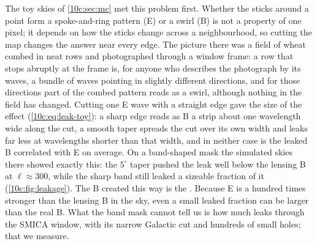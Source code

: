 The toy skies of \cref{10c:sec:mc} met this problem first. Whether the sticks around a point form a
spoke-and-ring pattern (E) or a swirl (B) is not a property of one pixel; it depends on how the sticks change
across a neighbourhood, so cutting the map changes the answer near every edge. The picture there was a field
of wheat combed in neat rows and photographed through a window frame: a row that stops abruptly at the frame
is, for anyone who describes the photograph by its waves, a bundle of waves pointing in slightly different
directions, and for those directions part of the combed pattern reads as a swirl, although nothing in the field
has changed. Cutting one E wave with a straight edge gave the size of the effect (\cref{10c:eq:leak-toy}): a
sharp edge reads as B a strip about one wavelength wide along the cut, a smooth taper spreads the cut over its
own width and leaks far less at wavelengths shorter than that width, and in neither case is the leaked B
correlated with E on average. On a band-shaped mask the simulated skies there showed exactly this: the $5^\circ$
taper pushed the leak well below the lensing B at $\ell\approx300$, while the sharp band still leaked a sizeable
fraction of it (\cref{10c:fig:leakage}). The B created this way is the . Because E is a
hundred times stronger than the lensing B in the sky, even a small leaked fraction can be larger than the real
B. What the band mask cannot tell us is how much leaks through the SMICA window, with its narrow Galactic cut
and hundreds of small holes; that we measure.

